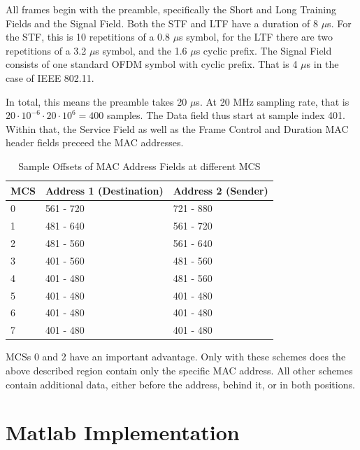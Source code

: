 All frames begin with the preamble, specifically the Short and Long Training Fields and the Signal Field. Both the STF and LTF have a duration of 8 $\mu$s. For the STF, this is 10 repetitions of a 0.8 $\mu$s symbol, for the LTF there are two repetitions of a 3.2 $\mu$s symbol, and the 1.6 $\mu$s cyclic prefix. The Signal Field consists of one standard \gls{OFDM} symbol with cyclic prefix. That is 4 $\mu$s in the case of IEEE 802.11.

In total, this means the preamble takes 20 $\mu$s. At 20 MHz sampling rate, that is $ 20 \cdot 10^{-6} \cdot 20 \cdot 10^6 = 400 $ samples. The Data field thus start at sample index 401. Within that, the Service Field as well as the Frame Control and Duration MAC header fields preceed the MAC addresses.\\

\begin{table}[ht]
	\begin{center}
		\begin{tabular}{|p{2.5cm}|p{4.5cm}|p{4.5cm}|}
			\hline
			\textbf{MCS} & \textbf{Address 1 (Destination)} & \textbf{Address 2 (Sender)} \\ \hline
			0 & 561 - 720 & 721 - 880 \\ \hline
			1 & 481 - 640 & 561 - 720 \\ \hline
			2 & 481 - 560 & 561 - 640 \\ \hline
			3 & 401 - 560 & 481 - 560 \\ \hline
			4 & 401 - 480 & 481 - 560 \\ \hline
			5 & 401 - 480 & 401 - 480 \\ \hline
			6 & 401 - 480 & 401 - 480 \\ \hline
			7 & 401 - 480 & 401 - 480 \\ \hline
		\end{tabular}
	\end{center}
	\caption{Sample Offsets of MAC Address Fields at different MCS}
	\label{tbl:sample-offsets}
\end{table}

\glspl{MCS} 0 and 2 have an important advantage. Only with these schemes does the above described region contain only the specific MAC address. All other schemes contain additional data, either before the address, behind it, or in both positions.



\section{Matlab Implementation}

